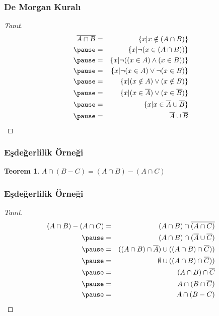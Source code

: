 \documentclass[dvipsnames]{beamer}
\theoremstyle{definition}
\theoremstyle{example}
\theoremstyle{plain}
\newtheorem{teorem}[theorem]{Teorem}
\begin{document}
\begin{frame}
  \frametitle{De Morgan Kuralı}

  \begin{proof}[Tanıt]
    \begin{eqnarray*}
      \overline{A \cap B} & = & \{x | x \notin (A \cap B)\}\\\pause
                          & = & \{x | \neg (x \in (A \cap B))\}\\\pause
                          & = & \{x | \neg ((x \in A) \wedge (x \in B))\}\\\pause
                          & = & \{x | \neg (x \in A) \vee \neg (x \in B)\}\\\pause
                          & = & \{x | (x \notin A) \vee (x \notin B)\}\\\pause
                          & = & \{x | (x \in \overline{A}) \vee (x \in \overline{B})\}\\\pause
                          & = & \{x | x \in \overline{A} \cup \overline{B}\}\\\pause
                          & = & \overline{A} \cup \overline{B}
    \end{eqnarray*}
  \end{proof}
\end{frame}

\begin{frame}
  \frametitle{Eşdeğerlilik Örneği}

  \begin{teorem}
    $A \cap (B-C) = (A \cap B) - (A \cap C)$
  \end{teorem}
\end{frame}

\begin{frame}
  \frametitle{Eşdeğerlilik Örneği}

  \begin{proof}[Tanıt]
    \begin{eqnarray*}
      (A \cap B) - (A \cap C)
          & = & (A \cap B) \cap \overline{(A \cap C)}\\\pause
          & = & (A \cap B) \cap (\overline{A} \cup \overline{C})\\\pause
          & = & ((A \cap B) \cap \overline{A}) \cup ((A \cap B) \cap \overline{C}))\\\pause
          & = & \emptyset \cup ((A \cap B) \cap \overline{C}))\\\pause
          & = & (A \cap B) \cap \overline{C}\\\pause
          & = & A \cap (B \cap \overline{C})\\\pause
          & = & A \cap (B - C)
    \end{eqnarray*}
  \end{proof}
\end{frame}
\end{document}
